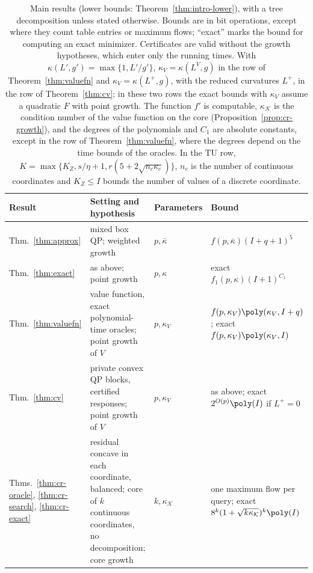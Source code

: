 \begin{table}[tb]
\centering
\small
\setlength{\tabcolsep}{2.5pt}
\caption{Main results (lower bounds: Theorem~\ref{thm:intro-lower}), with a
tree decomposition unless stated otherwise. Bounds are in bit operations,
except where they count table entries or maximum flows; ``exact'' marks the
bound for computing an exact minimizer. Certificates are valid without the
growth hypotheses, which enter only the running times. With
$\kappa(L',g')=\max\{1,L'/g'\}$, $\kappa_V=\kappa(L^V,g)$ in the row of
Theorem~\ref{thm:valuefn} and $\kappa_V=\kappa(L^+,g)$, with the reduced
curvatures $L^+$, in the row of Theorem~\ref{thm:cv}; in these two rows the
exact bounds with $\kappa_V$ assume a quadratic $F$ with point growth. The
function $f'$ is computable, $\kappa_{\mathcal K}$ is the condition number of
the value function on the core (Proposition~\ref{prop:cr-growth}), and the
degrees of the polynomials and $C_1$ are absolute constants, except in the
row of Theorem~\ref{thm:valuefn}, where the degrees depend on the time bounds
of the oracles. In the TU row,
$K=\max\{K_Z,s/\eta+1,r(5+2\sqrt{n_c\kappa_c})\}$, $n_c$ is the number of
continuous coordinates and $K_Z\le I$ bounds the number of values of a
discrete coordinate.}\label{tab:results}
\begin{tabular}{@{}>{\raggedright\arraybackslash}p{2.0cm}
>{\raggedright\arraybackslash}p{6.2cm}
>{\raggedright\arraybackslash}p{1.8cm}
>{\raggedright\arraybackslash}p{5.9cm}@{}}
\toprule
Result & Setting and hypothesis & Parameters & Bound\\
\midrule
Thm.~\ref{thm:approx} & mixed box QP; weighted growth &
$p,\bar\kappa$ & $f(p,\bar\kappa)(I+q+1)^5$\\
Thm.~\ref{thm:exact} & as above; point growth & $p,\kappa$ & exact
$f_1(p,\kappa)(I+1)^{C_1}$\\
Thm.~\ref{thm:valuefn} & value function, exact polynomial-time oracles;
point growth of $V$ & $p,\kappa_V$ &
$f(p,\kappa_V)\poly(\kappa_V,I+q)$; exact $f(p,\kappa_V)\poly(\kappa_V,I)$\\
Thm.~\ref{thm:cv} & private convex QP blocks, certified responses; point
growth of $V$ & $p,\kappa_V$ & as above; exact $2^{O(p)}\poly(I)$ if
$L^+=0$\\
Thms.~\ref{thm:cr-oracle}, \ref{thm:cr-search}, \ref{thm:cr-exact} &
residual concave in each coordinate, balanced; core of $k$ continuous
coordinates, no decomposition; core growth & $k,\kappa_{\mathcal K}$ & one maximum flow per
query; exact $8^k(1+\sqrt{k\kappa_{\mathcal K}})^k\poly(I)$\\

\end{tabular}
\end{table}
